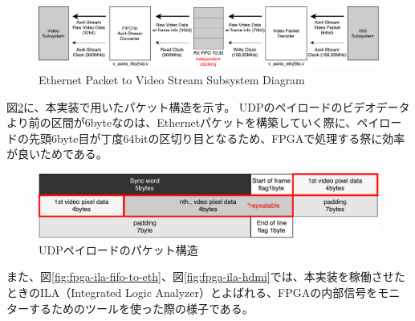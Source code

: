 \begin{figure}[htbp]
    \begin{center}
        \includegraphics[bb=0 0 911 166,width=15.5cm]{img/fpga-ethernet-video-diagram.pdf}
    \end{center}
    \caption{Ethernet Packet to Video Stream Subsystem Diagram}
    \label{fig:fpga-ethernet-video-diagram}
\end{figure}

図\ref{fig:fpga-video-packet}に、本実装で用いたパケット構造を示す。
UDPのペイロードのビデオデータより前の区間が6byteなのは、Ethernetパケットを構築していく際に、ペイロードの先頭6byte目が丁度64bitの区切り目となるため、FPGAで処理する祭に効率が良いためである。

\begin{figure}[htbp]
    \begin{center}
        \includegraphics[bb=0 0 643 122,width=15.5cm]{img/fpga-video-packet.pdf}
    \end{center}
    \caption{UDPペイロードのパケット構造}
    \label{fig:fpga-video-packet}
\end{figure}

また、図\ref{fig:fpga-ila-fifo-to-eth}、図\ref{fig:fpga-ila-hdmi}では、本実装を稼働させたときのILA（Integrated Logic Analyzer）とよばれる、FPGAの内部信号をモニターするためのツールを使った際の様子である。

